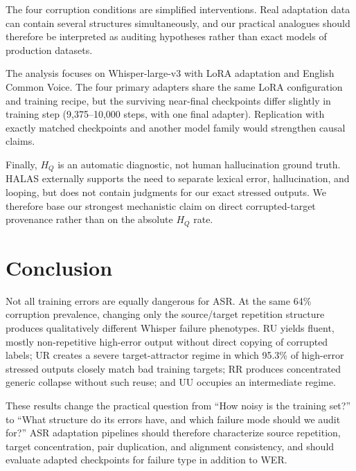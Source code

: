 \documentclass[conference]{IEEEtran}
\begin{document}
The four corruption conditions are simplified interventions. Real adaptation
data can contain several structures simultaneously, and our practical analogues
should therefore be interpreted as auditing hypotheses rather than exact models
of production datasets.

The analysis focuses on Whisper-large-v3 with LoRA adaptation and English Common
Voice. The four primary adapters share the same LoRA configuration and training
recipe, but the surviving near-final checkpoints differ slightly in training
step (9,375--10,000 steps, with one final adapter). Replication with exactly
matched checkpoints and another model family would strengthen causal claims.

Finally, $H_Q$ is an automatic diagnostic, not human hallucination ground truth.
HALAS externally supports the need to separate lexical error, hallucination, and
looping, but does not contain judgments for our exact stressed outputs. We
therefore base our strongest mechanistic claim on direct corrupted-target
provenance rather than on the absolute $H_Q$ rate.

\section{Conclusion}
Not all training errors are equally dangerous for ASR. At the same 64\%
corruption prevalence, changing only the source/target repetition structure
produces qualitatively different Whisper failure phenotypes. RU yields fluent,
mostly non-repetitive high-error output without direct copying of corrupted
labels; UR creates a severe target-attractor regime in which 95.3\% of high-error
stressed outputs closely match bad training targets; RR produces concentrated
generic collapse without such reuse; and UU occupies an intermediate regime.

These results change the practical question from ``How noisy is the training
set?'' to ``What structure do its errors have, and which failure mode should we
audit for?'' ASR adaptation pipelines should therefore characterize source
repetition, target concentration, pair duplication, and alignment consistency,
and should evaluate adapted checkpoints for failure type in addition to WER.



\end{document}
